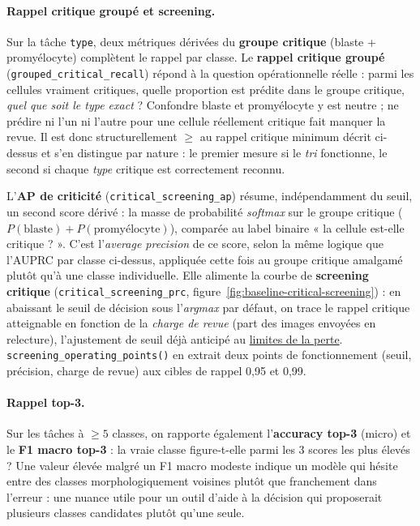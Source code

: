 \paragraph{Rappel critique groupé et screening.} Sur la tâche \texttt{type}, deux métriques dérivées du \textbf{groupe critique} (blaste + promyélocyte) complètent le rappel par classe.
Le \textbf{rappel critique groupé} (\texttt{grouped\_critical\_recall}) répond à la question opérationnelle réelle : parmi les cellules vraiment critiques, quelle proportion est prédite dans le groupe critique, \emph{quel que soit le type exact} ?
Confondre blaste et promyélocyte y est neutre ; ne prédire ni l'un ni l'autre pour une cellule réellement critique fait manquer la revue.
Il est donc structurellement $\geq$ au rappel critique minimum décrit ci-dessus et s'en distingue par nature : le premier mesure si le \emph{tri} fonctionne, le second si chaque \emph{type} critique est correctement reconnu.

L'\textbf{AP de criticité} (\texttt{critical\_screening\_ap}) résume, indépendamment du seuil, un second score dérivé : la masse de probabilité \emph{softmax} sur le groupe critique ($P(\text{blaste}) + P(\text{promyélocyte})$), comparée au label binaire « la cellule est-elle critique ? ».
C'est l'\emph{average precision} de ce score, selon la même logique que l'AUPRC par classe ci-dessus, appliquée cette fois au groupe critique amalgamé plutôt qu'à une classe individuelle.
Elle alimente la courbe de \textbf{screening critique} (\texttt{critical\_screening\_prc}, figure~\ref{fig:baseline-critical-screening}) : en abaissant le seuil de décision sous l'\emph{argmax} par défaut, on trace le rappel critique atteignable en fonction de la \emph{charge de revue} (part des images envoyées en relecture), l'ajustement de seuil déjà anticipé au \hyperref[sec:limites-loss]{limites de la perte}.
\texttt{screening\_operating\_points()} en extrait deux points de fonctionnement (seuil, précision, charge de revue) aux cibles de rappel 0,95 et 0,99.

\paragraph{Rappel top-3.} Sur les tâches à $\geq 5$ classes, on rapporte également l'\textbf{accuracy top-3} (micro) et le \textbf{F1 macro top-3} : la vraie classe figure-t-elle parmi les 3 scores les plus élevés ?
Une valeur élevée malgré un F1 macro modeste indique un modèle qui hésite entre des classes morphologiquement voisines plutôt que franchement dans l'erreur : une nuance utile pour un outil d'aide à la décision qui proposerait plusieurs classes candidates plutôt qu'une seule.

